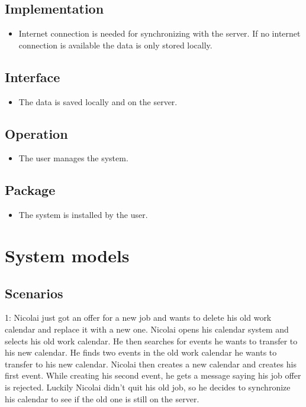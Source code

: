 \subsection*{Implementation}
\begin{itemize}
	\item Internet connection is needed for synchronizing with the server. If no internet connection is available the data is only stored locally.
\end{itemize}

\subsection*{Interface}
\begin{itemize}
	\item The data is saved locally and on the server.
\end{itemize}

\subsection*{Operation}
\begin{itemize}
	\item The user manages the system.
\end{itemize}

\subsection*{Package}
\begin{itemize}
	\item The system is installed by the user.
\end{itemize}

\pagebreak
\section*{System models}

\subsection*{Scenarios}

1: 
Nicolai just got an offer for a new job and wants to delete his old work calendar and replace it with a new one. Nicolai opens his calendar system and selects his old work calendar. He then searches for events he wants to transfer to his new calendar. He finds two events in the old work calendar he wants to transfer to his new calendar. Nicolai then creates a new calendar and creates his first event. While creating his second event, he gets a message saying his job offer is rejected. Luckily Nicolai didn’t quit his old job, so he decides to synchronize his calendar to see if the old one is still on the server.

